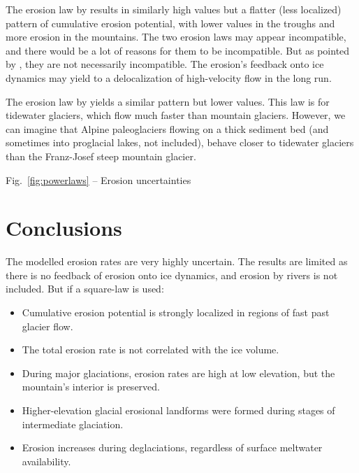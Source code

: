 \documentclass[utf8]{article}
\begin{document}
    The erosion law by \citet{Cook.etal.2020} results in similarly high values
    but a flatter (less localized) pattern of cumulative erosion potential,
    with lower values in the troughs and more erosion in the mountains. The two
    erosion laws may appear incompatible, and there would be a lot of reasons
    for them to be incompatible. But as pointed by \citet{Cook.etal.2020}, they
    are not necessarily incompatible. The erosion's feedback onto ice dynamics
    may yield to a delocalization of high-velocity flow in the long run.

    The erosion law by \citet{Koppes.etal.2015} yields a similar pattern but
    lower values. This law is for tidewater glaciers, which flow much faster
    than mountain glaciers. However, we can imagine that Alpine paleoglaciers
    flowing on a thick sediment bed (and sometimes into proglacial lakes, not
    included), behave closer to tidewater glaciers than the Franz-Josef steep
    mountain glacier.

    Fig.~\ref{fig:powerlaws} -- Erosion uncertainties

\section{Conclusions}

    The modelled erosion rates are very highly uncertain. The results are
    limited as there is no feedback of erosion onto ice dynamics, and
    erosion by rivers is not included. But if a square-law is used:
    \begin{itemize}
      \item Cumulative erosion potential is strongly localized in regions
        of fast past glacier flow.
      \item The total erosion rate is not correlated with the ice volume.
      \item During major glaciations, erosion rates are high at low elevation,
        but the mountain's interior is preserved.
      \item Higher-elevation glacial erosional landforms were formed during
        stages of intermediate glaciation.
      \item Erosion increases during deglaciations, regardless of surface
        meltwater availability.
    \end{itemize}
\end{document}
